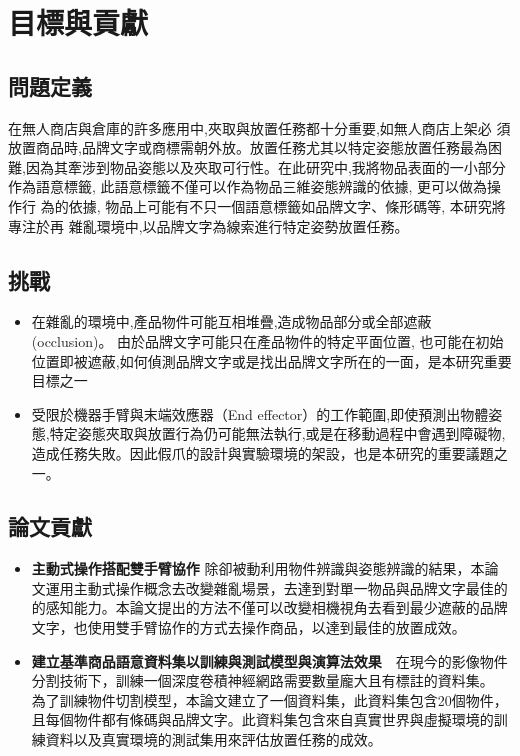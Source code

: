 \section{目標與貢獻}

\subsection{問題定義}
在無人商店與倉庫的許多應用中,夾取與放置任務都十分重要,如無人商店上架必
須放置商品時,品牌文字或商標需朝外放。放置任務尤其以特定姿態放置任務最為困
難,因為其牽涉到物品姿態以及夾取可行性。在此研究中,我將物品表面的一小部分
作為語意標籤, 此語意標籤不僅可以作為物品三維姿態辨識的依據, 更可以做為操作行
為的依據, 物品上可能有不只一個語意標籤如品牌文字、條形碼等, 本研究將專注於再
雜亂環境中,以品牌文字為線索進行特定姿勢放置任務。

\subsection{挑戰}
\begin{itemize}
\item 在雜亂的環境中,產品物件可能互相堆疊,造成物品部分或全部遮蔽 (occlusion)。
由於品牌文字可能只在產品物件的特定平面位置, 也可能在初始位置即被遮蔽,如何偵測品牌文字或是找出品牌文字所在的一面，是本研究重要目標之一
\item 受限於機器手臂與末端效應器（End effector）的工作範圍,即使預測出物體姿態,特定姿態夾取與放置行為仍可能無法執行,或是在移動過程中會遇到障礙物,造成任務失敗。因此假爪的設計與實驗環境的架設，也是本研究的重要議題之一。
\end{itemize}

\subsection{論文貢獻}
\begin{itemize}
\item \textbf{主動式操作搭配雙手臂協作} 除卻被動利用物件辨識與姿態辨識的結果，本論文運用主動式操作概念去改變雜亂場景，去達到對單一物品與品牌文字最佳的的感知能力。本論文提出的方法不僅可以改變相機視角去看到最少遮蔽的品牌文字，也使用雙手臂協作的方式去操作商品，以達到最佳的放置成效。
\item \textbf{建立基準商品語意資料集以訓練與測試模型與演算法效果}　在現今的影像物件分割技術下，訓練一個深度卷積神經網路需要數量龐大且有標註的資料集。
為了訓練物件切割模型，本論文建立了一個資料集，此資料集包含20個物件，且每個物件都有條碼與品牌文字。此資料集包含來自真實世界與虛擬環境的訓練資料以及真實環境的測試集用來評估放置任務的成效。
\end{itemize}

